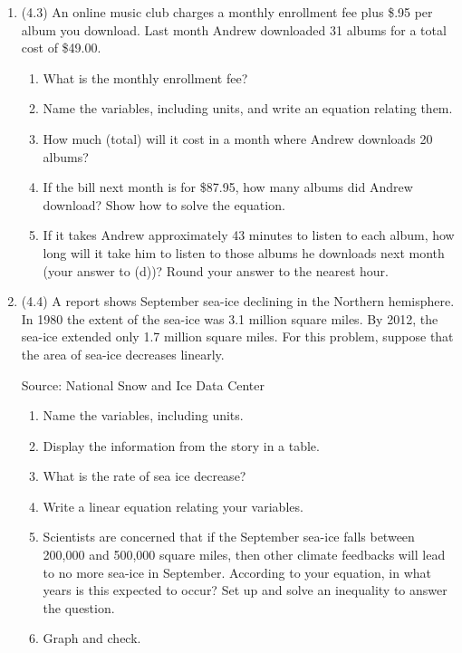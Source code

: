 \documentclass[12pt]{article}
\begin{document}
\begin{enumerate}
\item (4.3) An online music club charges a monthly enrollment fee plus \$.95 per album you download.  Last month Andrew downloaded 31 albums for a total cost of \$49.00.  
\begin{enumerate}
\item What is the monthly enrollment fee?
\item Name the variables, including units, and write an equation relating them.
\item How much (total) will it cost  in a month where Andrew downloads 20 albums?
\item If the bill next month is for \$87.95, how many albums did Andrew download? Show how to solve the equation.
\item If it takes Andrew approximately 43 minutes to listen to each album, how long will it take him to listen to those albums he downloads next month (your answer to (d))?  Round your answer to the nearest hour.
\end{enumerate}

\item (4.4) A report  shows September sea-ice declining in the Northern hemisphere. In 1980 the extent of the sea-ice was 3.1 million square miles.  By 2012, the sea-ice extended only 1.7 million square miles.  For this problem, suppose that the area of sea-ice decreases linearly. 
\hfill \begin{footnotesize} Source: National Snow and Ice Data Center \end{footnotesize}
\begin{enumerate}
\item Name the variables, including units.
\item Display the information from the story in a table.
\item What is the rate of sea ice decrease? 
\item Write a linear equation relating your variables.
\item Scientists are concerned that if the September sea-ice falls between 200,000 and 500,000 square miles, then other climate feedbacks will lead to no more sea-ice in September.  According to your equation, in what years is this expected to occur?  Set up and solve an inequality to answer the question.
\item Graph and check.
\end{enumerate}


\end{enumerate}
\end{document}
